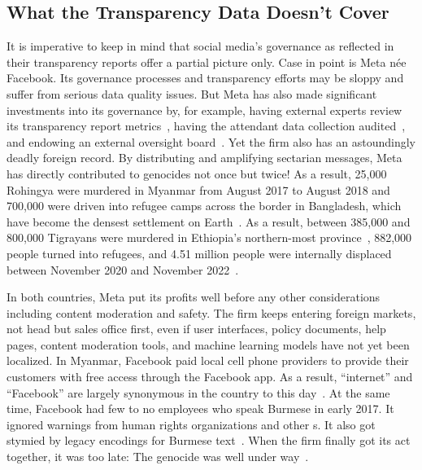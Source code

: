 \subsection{What the Transparency Data Doesn't Cover}
\label{sec:census-limits}

It is imperative to keep in mind that social media's governance as reflected in
their transparency reports offer a partial picture only. Case in point is Meta
n\'ee Facebook. Its governance processes and transparency efforts may be sloppy
and suffer from serious data quality issues. But Meta has also made significant
investments into its governance by, for example, having external experts review
its transparency report metrics~\cite{BradfordGriselea2019}, having the
attendant data collection audited~\cite{Sarang2022}, and endowing an external
oversight board~\cite{BoteroMarinoGreeneea2020}. Yet the firm also has an
astoundingly deadly foreign record. By distributing and amplifying sectarian
messages, Meta has directly contributed to genocides not once but twice! As a
result, 25,000 Rohingya were murdered in Myanmar from August 2017 to August 2018
and 700,000 were driven into refugee camps across the border in Bangladesh,
which have become the densest settlement on
Earth~\cite{DeGuzman2022,HumanRightsCouncil2018}. As a result, between 385,000
and 800,000 Tigrayans were murdered in Ethiopia's northern-most
province~\cite{AnnysVandenBemptea2021,ChothiaBekit2022}, 882,000 people turned
into refugees, and 4.51 million people were internally displaced between
November 2020 and November 2022~\cite{UNICEF2023}.

In both countries, Meta put its profits well before any other considerations
including content moderation and safety. The firm keeps entering foreign
markets, not head but sales office first, even if user interfaces, policy
documents, help pages, content moderation tools, and machine learning models
have not yet been localized. In Myanmar, Facebook paid local cell phone
providers to provide their customers with free access through the Facebook app.
As a result, ``internet'' and ``Facebook'' are largely synonymous in the country
to this day~\cite{Strom2016}. At the same time, Facebook had few to no employees
who speak Burmese in early 2017. It ignored warnings from human rights
organizations and other s. It also got stymied by legacy encodings for
Burmese text~\cite{LaGrowPruzan2019,Wade2022}. When the firm finally got its act
together, it was too late: The genocide was well under
way~\cite{McLaughlin2018,MilkoOrtutay2022,Mozur2018,Ortutay2022}.

